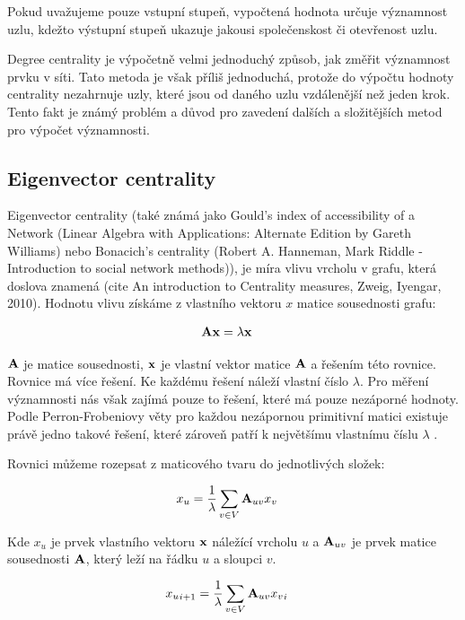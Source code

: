 \documentclass{bakalarka}
\begin{document}
Pokud uvažujeme pouze vstupní stupeň, vypočtená hodnota určuje významnost uzlu,
kdežto výstupní stupeň ukazuje jakousi společenskost či otevřenost uzlu. 

Degree centrality je výpočetně velmi jednoduchý způsob, jak změřit významnost
prvku v síti. Tato metoda je však příliš jednoduchá, protože do výpočtu hodnoty
centrality nezahrnuje uzly, které jsou od daného uzlu vzdálenější než jeden
krok. Tento fakt je známý problém a důvod pro zavedení dalších a složitějších
metod pro výpočet významnosti.



\subsection{Eigenvector centrality}
Eigenvector centrality (také známá jako Gould's index of accessibility of a
Network (Linear Algebra with Applications: Alternate Edition by Gareth
Williams) nebo Bonacich's centrality (Robert A. Hanneman, Mark Riddle -
Introduction to social network methods)), je míra vlivu vrcholu v grafu, která
doslova znamená  (cite An introduction to
Centrality measures, Zweig, Iyengar, 2010). Hodnotu vlivu získáme z vlastního
vektoru $x$ matice sousednosti grafu:

\begin{align*}
{\bf Ax} &= \lambda {\bf x}
\end{align*}

${\bf A}$ je matice sousednosti, ${\bf x}$ je vlastní vektor matice ${\bf A}$ a
řešením této rovnice. Rovnice má více řešení. Ke každému řešení náleží vlastní
číslo $\lambda$. Pro měření významnosti nás však zajímá pouze to řešení, které
má pouze nezáporné hodnoty. Podle Perron-Frobeniovy věty pro každou nezápornou
primitivní matici existuje právě jedno takové řešení, které zároveň patří k
největšímu vlastnímu číslu $\lambda$ \cite{langvillemeyer}.

Rovnici můžeme rozepsat z maticového tvaru do jednotlivých složek:

\begin{align*} 
x_u &=  \frac{1}{\lambda} \displaystyle\sum_{v \in V} {\bf A}_{uv} x_v 
\end{align*} 

Kde $x_u$ je prvek vlastního vektoru ${\bf x}$
náležící vrcholu $u$ a ${\bf A}_{uv}$ je prvek matice sousednosti ${\bf A}$,
který leží na řádku $u$ a sloupci $v$.

\begin{align*} 
{x_u}_{i + 1} &=  \frac{1}{\lambda} \displaystyle\sum_{v \in V} {\bf A}_{uv}
{x_v}_{i}
\end{align*} 
\end{document}
